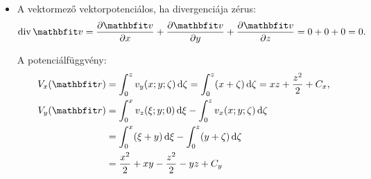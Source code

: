 \documentclass[lang=magyar]{math-handout}
\begin{document}
\begin{exercise}
{\begin{enumerate}[a)]
\begin{itemize}
                    A potenciálfüggvény:
                    \begin{align*}
                      \varphi(\rvec r)
                       & =
                      \int_0^x v_x(\xi; y; z) \,\diff \xi +
                      \int_0^y v_y(0; \eta; z) \,\diff \eta +
                      \int_0^z v_z(0; 0; \zeta) \,\diff \zeta
                      \\
                       & =
                      \int_0^x (y + z) \,\diff \xi +
                      \int_0^y (0 + z) \,\diff \eta +
                      \int_0^z (0 + 0) \,\diff \zeta
                      \\
                       & =
                      xy + xz + yz + C
                      \text.
                    \end{align*}

                    A kereseett potenciálfüggvény:
                    \[
                      \varPhi (\rvec r)
                      =
                      xy + xz + yz
                      \text.
                    \]

              \item A vektormező vektorpotenciálos, ha divergenciája zérus:
                    \[
                      \Div \rvec v
                      =
                      \pdv{\rvec v}{x} + \pdv{\rvec v}{y} + \pdv{\rvec v}{z}
                      =
                      0 + 0 + 0
                      =
                      0
                      \text.
                    \]

                    A potenciálfüggvény:
                    \begin{align*}
                      V_x(\rvec r)
                       & =
                      \int_0^z v_y(x; y; \zeta) \,\diff \zeta
                      =
                      \int_0^z (x + \zeta) \,\diff \zeta
                      =
                      xz + \frac{z^2}{2} + C_x
                      \text,
                      \\
                      V_y(\rvec r)
                       & =
                      \int_0^x v_z(\xi; y; 0) \,\diff \xi -
                      \int_0^z v_x(x; y; \zeta) \,\diff \zeta
                      \\
                       & =
                      \int_0^x (\xi + y) \,\diff \xi -
                      \int_0^z (y + \zeta) \,\diff \zeta
                      \\
                       & =
                      \frac{x^2}{2} + xy -
                      \frac{z^2}{2} - yz + C_y
                    \end{align*}


\end{itemize}
\end{enumerate}}
\end{exercise}
\end{document}
